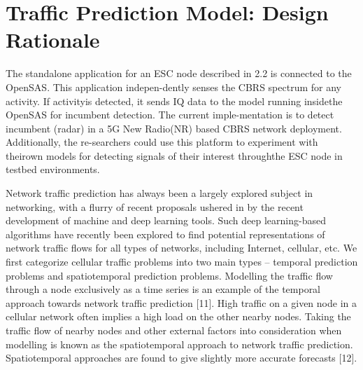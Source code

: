 \documentclass[conference]{IEEEtran}
\begin{document}
\begin{comment}
\begin{algorithm}
\caption{Cell Bringup Procedure}
\SetAlgoLined
\KwData{For each cell we have desired pattern for CQI distribution for each traffic pattern and time of day}
\For{each cell}{
    Measure the distance between CQI distributions observed and desired\;
    \If{the observed is off by a certain threshold}{
        Turn the cell ON\;
        Recalculate the predicted CQI distribution\;
        \If{the distribution improves}{
            Keep the cell ON\;
        }
        \Else{
            Leave the cell OFF\;
        }
    }
}
\end{algorithm}

\begin{algorithm}
    \SetKwInOut{Input}{Input}
    \SetKwInOut{Output}{Output}

    \underline{function CellBringup} $()$\;
    \Input{Two nonnegative integers $a$ and $b$}
    \Output{$\gcd(a,b)$}
    \eIf{$b=0$}
      {
        return $a$\;
      }
      {
        return Euclid$(b,a\mod b)$\;
      }
    \caption{Algorithm}
\end{algorithm}
\end{comment}

\section{Traffic Prediction Model: Design Rationale}

The standalone application for an ESC node described in 2.2 is connected to the OpenSAS. This application indepen-dently senses the CBRS spectrum for any activity. If activityis detected, it sends IQ data to the model running insidethe OpenSAS for incumbent detection. The current imple-mentation is to detect incumbent (radar) in a 5G New Radio(NR) based CBRS network deployment. Additionally, the re-searchers could use this platform to experiment with theirown models for detecting signals of their interest throughthe ESC node in testbed environments.

Network traffic prediction has always been a largely explored subject in networking, with a flurry of recent proposals ushered in by the recent development of machine and deep learning tools. Such deep learning-based algorithms have recently been explored to find potential representations of network traffic flows for all types of networks, including Internet, cellular, etc. We first categorize cellular traffic problems into two main types – temporal prediction problems and spatiotemporal prediction problems. Modelling the traffic flow through a node exclusively as a time series is an example of the temporal approach towards network traffic prediction [11]. High traffic on a given node in a cellular network often implies a high load on the other nearby nodes. Taking the traffic flow of nearby nodes and other external factors into consideration when modelling is known as the spatiotemporal approach to network traffic prediction. Spatiotemporal approaches are found to give slightly more accurate forecasts [12].
\end{document}
